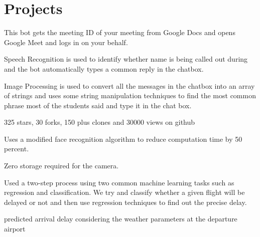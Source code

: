 \documentclass[]{deedy-resume-reversed}
\begin{document}
\begin{minipage}[t]{0.60\textwidth}
\section{Projects}
\begin{tightemize}
\item This bot gets the meeting ID of your meeting from Google Docs and opens Google Meet and logs in on your behalf.
\item Speech Recognition is used to identify whether name is being called out during  and the bot automatically types a common reply in the chatbox.
\item Image Processing is used to convert all the messages in the chatbox into an array of strings and uses some string manipulation techniques to find the most common phrase most of the students said and type it in the chat box.
\item 325 stars, 30 forks, 150 plus clones and 30000 views on github
\end{tightemize}
\sectionsep

\begin{tightemize}
\item  Uses a modified face recognition algorithm to reduce computation time by 50 percent.
\item  Zero storage required for the camera.

\end{tightemize}
\sectionsep


\begin{tightemize}
\item  Used a two-step process using two common machine learning tasks such as regression and classification. We try and classify whether a given flight will be delayed or not and then use regression techniques to find out the precise delay.
\item  predicted arrival delay considering the weather parameters at the departure airport

\end{tightemize}
\sectionsep



\end{minipage}
\end{document}
